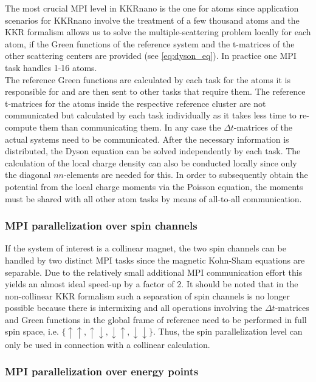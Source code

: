 \documentclass [a4paper, 12pt]{article}
\begin{document}
The most crucial MPI level in KKRnano is the one for atoms since application scenarios for KKRnano
involve the treatment of a few thousand atoms and the KKR formalism allows us to solve the
multiple-scattering problem locally for each atom, if the Green functions of the reference system and
the t-matrices of the other scattering centers are provided (see \cref{eq:dyson_eq}).
In practice one MPI task handles 1-16 atoms.
\\
The reference Green functions are calculated by each task
for the atoms it is responsible for and are then sent to other tasks that require them. 
The reference t-matrices for the atoms inside the respective reference cluster are not communicated 
but calculated by each task individually as it takes less time to re-compute them than communicating them.
In any case the $\Delta t$-matrices of the actual systems need to be communicated.
After the necessary information is distributed, the Dyson equation can be solved independently by each task.
The calculation of the local charge density can also be conducted locally since only the diagonal
$nn$-elements are needed for this.
In order to subsequently obtain the potential from the local charge moments via the Poisson equation,
the moments must be shared with all other atom tasks by means of all-to-all communication.

\subsubsection*{MPI parallelization over spin channels}

If the system of interest is a collinear magnet, the two spin channels can be handled by two distinct
MPI tasks since the
magnetic Kohn-Sham equations are separable.
Due to the relatively small additional MPI communication effort
this yields an almost ideal speed-up by a factor of 2.
It should be noted that in the non-collinear KKR formalism such a 
separation of spin channels is no longer possible because 
there is intermixing and all operations involving the
$\Delta t$-matrices and Green functions in the global frame of reference
need to be performed in full spin space, i.e. $\{\uparrow \uparrow, \uparrow \downarrow,
\downarrow \uparrow, \downarrow \downarrow \}$.
Thus, the spin parallelization level can only be used in connection with
a collinear calculation.


\subsubsection*{MPI parallelization over energy points}
\end{document}
